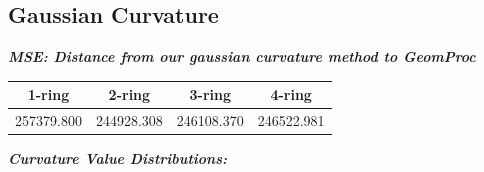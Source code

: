 \documentclass{article}
\renewcommand{\i}[1]{\textit{{#1}}}
\renewcommand{\b}[1]{\textbf{{#1}}}
\begin{document}
\subsection{Gaussian Curvature}
\begin{center}
\b{\i{MSE: Distance from our gaussian curvature method to GeomProc}}
\smallbreak
\begin{tabular}{|c|c|c|c|}
    \hline
    1-ring & 2-ring & 3-ring & 4-ring \\
    \hline
    257379.800 & 244928.308 & 246108.370 & 246522.981 \\
    \hline
\end{tabular}
\end{center}
\bigbreak
\begin{center}
\b{\i{Curvature Value Distributions:}}
\end{center}
\smallbreak
{}
\end{document}
